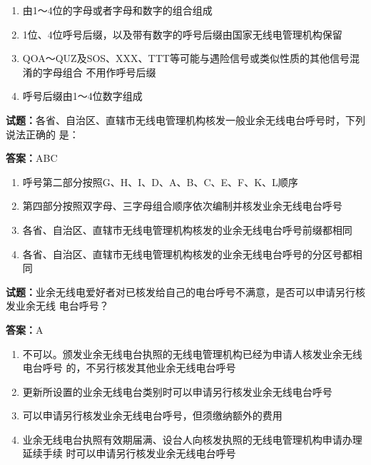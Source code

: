 \documentclass{ctexbook}
\begin{document}
\begin{enumerate}[leftmargin=3em]
  \item 由1～4位的字母或者字母和数字的组合组成 

  \item 1位、4位呼号后缀，以及带有数字的呼号后缀由国家无线电管理机构保留 

  \item QOA～QUZ及SOS、XXX、TTT等可能与遇险信号或类似性质的其他信号混淆的字母组合
不用作呼号后缀 

  \item 呼号后缀由1～4位数字组成 

\end{enumerate}





\vspace{1em}

\textbf{试题：}各省、自治区、直辖市无线电管理机构核发一般业余无线电台呼号时，下列说法正确的
是： 

\textbf{答案：}ABC 

\begin{enumerate}[leftmargin=3em]
  \item 呼号第二部分按照G、H、I、D、A、B、C、E、F、K、L顺序 

  \item 第四部分按照双字母、三字母组合顺序依次编制并核发业余无线电台呼号 

  \item 各省、自治区、直辖市无线电管理机构核发的业余无线电台呼号前缀都相同 

  \item 各省、自治区、直辖市无线电管理机构核发的业余无线电台呼号的分区号都相同 

\end{enumerate}





\vspace{1em}

\textbf{试题：}业余无线电爱好者对已核发给自己的电台呼号不满意，是否可以申请另行核发业余无线
电台呼号？ 

\textbf{答案：}A 

\begin{enumerate}[leftmargin=3em]
  \item 不可以。颁发业余无线电台执照的无线电管理机构已经为申请人核发业余无线电台呼号
的，不另行核发其他业余无线电台呼号 

  \item 更新所设置的业余无线电台类别时可以申请另行核发业余无线电台呼号 

  \item 可以申请另行核发业余无线电台呼号，但须缴纳额外的费用 


  \item 业余无线电台执照有效期届满、设台人向核发执照的无线电管理机构申请办理延续手续
时可以申请另行核发业余无线电台呼号 

\end{enumerate}
\end{document}
